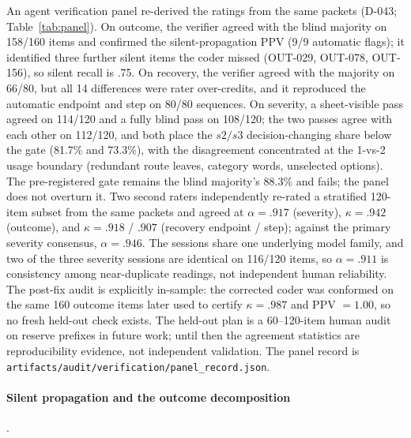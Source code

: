 \documentclass[a4paper,fleqn]{cas-sc}
\begin{document}
An agent verification panel re-derived the ratings from the same packets (D-043; Table~\ref{tab:panel}). On outcome, the
verifier agreed with the blind majority on 158/160 items and confirmed the silent-propagation PPV
(9/9 automatic flags); it identified three further silent items the coder missed (OUT-029, OUT-078,
OUT-156), so silent recall is .75. On recovery, the verifier agreed with the majority on 66/80,
but all 14 differences were rater over-credits, and it reproduced the automatic endpoint and step
on 80/80 sequences. On severity, a sheet-visible pass agreed on 114/120 and a fully blind pass on
108/120; the two passes agree with each other on 112/120, and both place the $s2/s3$
decision-changing share below the gate (81.7\% and 73.3\%), with the disagreement concentrated at
the 1-vs-2 usage boundary (redundant route leaves, category words, unselected options). The
pre-registered gate remains the blind majority's 88.3\% and fails; the panel does not overturn it.
Two second raters independently re-rated a stratified 120-item subset from the same packets and
agreed at $\alpha = .917$ (severity), $\kappa = .942$ (outcome), and $\kappa = .918$ / $.907$
(recovery endpoint / step); against the primary severity consensus, $\alpha = .946$. The sessions
share one underlying model family, and two of the three severity sessions are identical on
116/120 items, so $\alpha = .911$ is consistency among near-duplicate readings, not independent
human reliability. The post-fix audit is explicitly in-sample: the corrected coder was conformed
on the same 160 outcome items later used to certify $\kappa=.987$ and PPV $=1.00$, so no fresh
held-out check exists. The held-out plan is a 60--120-item human audit on reserve prefixes in
future work; until then the agreement statistics are reproducibility evidence, not independent
validation. The panel record is
\texttt{artifacts/audit/verification/panel\_record.json}.


\paragraph{Silent propagation and the outcome decomposition}.\
\end{document}
